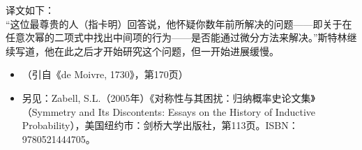 \begin{enumerate}
译文如下：\\
“这位最尊贵的人（指卡明）回答说，他怀疑你数年前所解决的问题——即关于在任意次幂的二项式中找出中间项的行为——是否能通过微分方法来解决。”斯特林继续写道，他在此之后才开始研究这个问题，但一开始进展缓慢。
\begin{itemize}
\item （引自《de Moivre, 1730》，第170页）
\item 另见：Zabell, S.L.（2005年）《对称性与其困扰：归纳概率史论文集》（Symmetry and Its Discontents: Essays on the History of Inductive Probability），美国纽约市：剑桥大学出版社，第113页。ISBN：9780521444705。
\end{itemize}

\end{enumerate}